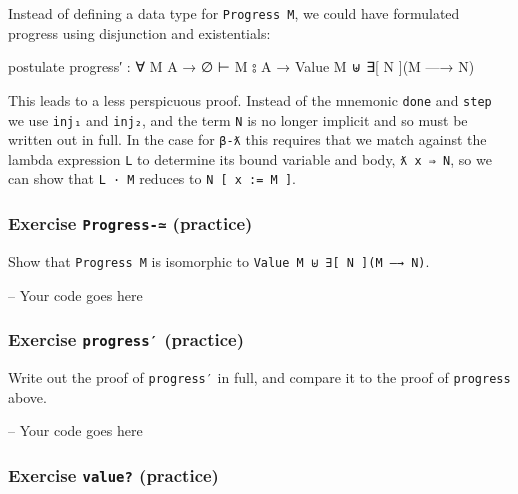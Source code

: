 Instead of defining a data type for \texttt{Progress\ M}, we could have
formulated progress using disjunction and existentials:

\begin{fence}
\begin{code}
postulate
  progress′ : ∀ M {A} → ∅ ⊢ M ⦂ A → Value M ⊎ ∃[ N ](M —→ N)
\end{code}
\end{fence}

This leads to a less perspicuous proof. Instead of the mnemonic
\texttt{done} and \texttt{step} we use \texttt{inj₁} and \texttt{inj₂},
and the term \texttt{N} is no longer implicit and so must be written out
in full. In the case for \texttt{β-ƛ} this requires that we match
against the lambda expression \texttt{L} to determine its bound variable
and body, \texttt{ƛ\ x\ ⇒\ N}, so we can show that \texttt{L\ ·\ M}
reduces to \texttt{N\ {[}\ x\ :=\ M\ {]}}.

\hypertarget{exercise-progress--practice}{%
\subsubsection{\texorpdfstring{Exercise \texttt{Progress-≃}
(practice)}{Exercise Progress-≃ (practice)}}\label{exercise-progress--practice}}

Show that \texttt{Progress\ M} is isomorphic to
\texttt{Value\ M\ ⊎\ ∃{[}\ N\ {]}(M\ —→\ N)}.

\begin{fence}
\begin{code}
-- Your code goes here
\end{code}
\end{fence}

\hypertarget{exercise-progress-practice}{%
\subsubsection{\texorpdfstring{Exercise \texttt{progress′}
(practice)}{Exercise progress′ (practice)}}\label{exercise-progress-practice}}

Write out the proof of \texttt{progress′} in full, and compare it to the
proof of \texttt{progress} above.

\begin{fence}
\begin{code}
-- Your code goes here
\end{code}
\end{fence}

\hypertarget{exercise-value-practice}{%
\subsubsection{\texorpdfstring{Exercise \texttt{value?}
(practice)}{Exercise value? (practice)}}\label{exercise-value-practice}}

